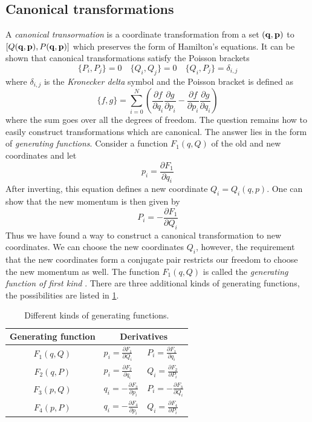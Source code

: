 \documentclass[ twoside,openright,titlepage,numbers=noenddot,headinclude,%
                footinclude=true,cleardoublepage=empty,abstractoff, %
                BCOR=5mm,paper=a4,fontsize=11pt,%
                american,%
                ]{scrreprt}
\begin{document}
\subsection{Canonical transformations}
\label{sub:Canonical transformations}
A \emph{canonical transormation} is a coordinate transformation
from a set $(\boldsymbol{\mathbf{q}},\boldsymbol{\mathbf{p}})$ to $\left[Q(\boldsymbol{\mathbf{q}},\boldsymbol{\mathbf{p}}),
P(\boldsymbol{\mathbf{q}},\boldsymbol{\mathbf{p}})\right]$ which preserves the form of Hamilton's
equations. It can be shown that canonical transformations
satisfy the Poisson brackets
\begin{equation}
    \{P_i,P_j\}=0\quad\{Q_i,Q_j\}=0\quad\{Q_i,P_j\}=\delta_{i,j}
\end{equation}
where $\delta_{i,j}$ is the \emph{Kronecker delta} symbol and
the Poisson bracket is defined as
\begin{equation}
    \{f,g\}=\sum^N_{i=0}\left( \frac{\partial f}{\partial q_i} 
    \frac{\partial g}{\partial p_i} -\frac{\partial f}{\partial p_i} 
    \frac{\partial g}{\partial q_i} \right)
\end{equation}
where the sum goes over all the degrees of freedom. The question remains 
how to easily construct transformations which are canonical. The
answer lies in the form of \emph{generating functions}. Consider
a function $F_1(q,Q)$ of the old and new coordinates and let
\begin{equation}
    p_i= \frac{\partial F_1}{\partial q_i} 
\end{equation}
After inverting, this equation defines a new coordinate $Q_i=Q_i(q,p)$.
One can show that the new momentum is then given by
\begin{equation}
    P_i=- \frac{\partial F_1}{\partial Q_i} 
\end{equation}
Thus we have found a way to construct a canonical transformation to new
coordinates. We can choose the new coordinates $Q_i$, however, the requirement 
that the new coordinates form a conjugate pair restricts our freedom
to choose the new momentum as well. The function $F_1(q,Q)$ is called
the \emph{generating function of first kind} . There are three additional
kinds of generating functions, the possibilities are listed in 
\cref{tab:generating_functions}.
\begin{table}[h!]
\centering
\begin{tabular}{cll}
\toprule
    Generating function &\multicolumn{2}{c}{Derivatives}\\
\midrule
    $F_1(q,Q)$ & $p_i=\frac{\partial F_1}{\partial Q_i}$ & 
    $P_i=\frac{\partial F_1}{\partial q_i}$\\
    $F_2(q,P)$ & $p_i=\frac{\partial F_2}{\partial q_i}$ & 
    $Q_i=\frac{\partial F_2}{\partial P_i}$\\
    $F_3(p,Q)$ & $q_i=-\frac{\partial F_3}{\partial p_i}$ & 
    $P_i=-\frac{\partial F_3}{\partial Q_i}$\\
    $F_4(p,P)$ & $q_i=-\frac{\partial F_4}{\partial p_i}$ & 
    $Q_i=\frac{\partial F_4}{\partial P_i}$\\
\bottomrule
\end{tabular}
\caption{Different kinds of generating functions.}
\label{tab:generating_functions}
\end{table}
\end{document}
